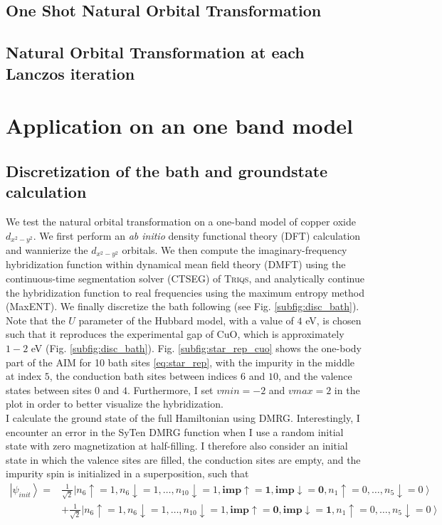 \documentclass[11pt]{article}
\newcommand{\ket}[1]{\left| {#1} \right>}
\newcommand{\dxy}{d_{x^2-y^2}}
\begin{document}
\subsection{One Shot Natural Orbital Transformation}
\subsection{Natural Orbital Transformation at each Lanczos iteration}
\section{Application on an one band model}
\subsection{Discretization of the bath and groundstate calculation}
We test the natural orbital transformation on a one-band model of copper oxide $\dxy$. We first perform an \textit{ab initio} density functional theory (DFT) calculation and wannierize the $\dxy$ orbitals. We then compute the imaginary-frequency hybridization function within dynamical mean field theory (DMFT) using the continuous-time segmentation solver (CTSEG) of \textsc{Triqs}, and analytically continue the hybridization function to real frequencies using the maximum entropy method (MaxENT). We finally discretize the bath following \cite{de_vega_how_2015} (see Fig. \ref{subfig:disc_bath}). Note that the $U$ parameter of the Hubbard model, with a value of $4$ eV, is chosen such that it reproduces the experimental gap of CuO, which is approximately $1-2$ eV (Fig. \ref{subfig:disc_bath}). Fig. \ref{subfig:star_rep_cuo} shows the one-body part of the AIM for 10 bath sites \eqref{eq:star_rep}, with the impurity in the middle at index $5$, the conduction bath sites between indices $6$ and $10$, and the valence states between sites $0$ and $4$. Furthermore, I set $vmin=-2$ and $vmax=2$ in the plot in order to better visualize the hybridization.\\
I calculate the ground state of the full Hamiltonian using DMRG. Interestingly, I encounter an error in the SyTen DMRG function when I use a random initial state with zero magnetization at half-filling. I therefore also consider an initial state in which the valence sites are filled, the conduction sites are empty, and the impurity spin is initialized in a superposition, such that
\begin{align*}
	\ket{\psi_{init}} = & \frac{1}{\sqrt{2}}\ket{n_6\uparrow=1, n_6\downarrow=1, \ldots, n_{10}\downarrow=1, \mathbf{imp\uparrow=1}, \mathbf{imp\downarrow=0}, n_1\uparrow=0, \ldots, n_5\downarrow=0}\\
& + \frac{1}{\sqrt{2}}\ket{n_6\uparrow=1, n_6\downarrow=1, \ldots, n_{10}\downarrow=1, \mathbf{imp\uparrow=0}, \mathbf{imp\downarrow=1}, n_1\uparrow=0, \ldots, n_5\downarrow=0}
\end{align*}
\end{document}
